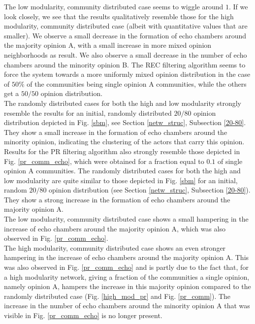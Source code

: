 \documentclass[11 pt , letterpaper , twoside , openright]{book}
\begin{document}
\newline
The low modularity, community distributed case seems to wiggle around $1$. If we look closely, we see that the results qualitatively resemble those for the high modularity, community distributed case (albeit with quantitative values that are smaller). We observe a small decrease in the formation of echo chambers around the majority opinion A, with a small increase in more mixed opinion neighborhoods as result. We also observe a small decrease in the number of echo chambers around the minority opinion B. The REC filtering algorithm seems to force the system towards a more uniformly mixed opinion distribution in the case of $50 \%$ of the communities being single opinion A communities, while the others get a $50/50$ opinion distribution.\\
\newline
The randomly distributed cases for both the high and low modularity strongly resemble the results for an initial, randomly distributed $20/80$ opinion distribution depicted in Fig. \ref{sbm}, see Section \ref{netw_struc}, Subsection \ref{20-80}. They show a small increase in the formation of echo chambers around the minority opinion, indicating the clustering of the actors that carry this opinion.\\
\newline
Results for the PR filtering algorithm also strongly resemble those depicted in Fig. \ref{pr_comm_echo}, which were obtained for a fraction equal to $0.1$ of single opinion A communities. The randomly distributed cases for both the high and low modularity are quite similar to those depicted in Fig. \ref{sbm} for an initial, random $20/80$ opinion distribution (see Section \ref{netw_struc}, Subsection \ref{20-80}). They show a strong increase in the formation of echo chambers around the majority opinion A.\\
\newline
The low modularity, community distributed case shows a small hampering in the increase of echo chambers around the majority opinion A, which was also observed in Fig. \ref{pr_comm_echo}.\\
\newline
The high modularity, community distributed case shows an even stronger hampering in the increase of echo chambers around the majority opinion A. This was also observed in Fig. \ref{pr_comm_echo} and is partly due to the fact that, for a high modularity network, giving a fraction of the communities a single opinion, namely opinion A, hampers the increase in this majority opinion compared to the randomly distributed case (Fig. \ref{high_mod_pr} and Fig. \ref{pr_comm}). The increase in the number of echo chambers around the minority opinion A that was visible in Fig. \ref{pr_comm_echo} is no longer present.
\end{document}
